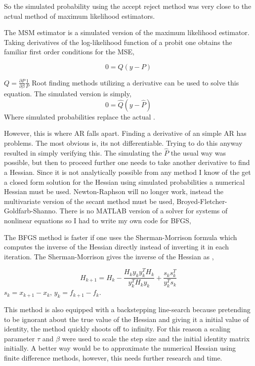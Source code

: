 \documentclass[]{article}
\begin{document}
 So the simulated probability using the accept reject method was very close to the actual method of maximum likelihood estimators. 
 
 The MSM estimator is a simulated version of the maximum likelihood estimator. Taking derivatives of the log-likelihood function of a probit one obtains the familiar first order conditions for the MSE, 
 
 \[ 0 = Q(y - P) \]
 
 $ Q = \frac{\partial P}{\partial\beta} \frac{1}{P} $ Root finding methods utilizing a derivative can be used to solve this equation. The simulated version is simply, 
 \[ 0 = \hat{Q}(y - \hat{P}) \]
 Where simulated probabilities replace the actual \cite{sternSimulation}. 
 
 However, this is where AR falls apart. Finding a derivative of an simple AR has problems. The most obvious is, its not differentiable. Trying to do this anyway resulted in simply verifying this. The simulating the $ \hat{P} $ the usual way was possible, but then to proceed further one needs to take another derivative to find a Hessian. Since it is not analytically possible from any method I know of the get a closed form solution for the Hessian using simulated probabilities a numerical Hessian must be used. Newton-Raphson will no longer work, instead the multivariate version of the secant method must be used, Broyed-Fletcher-Goldfarb-Shanno. There is no MATLAB version of a solver for systems of nonlinear equations so I had to write my own code for BFGS, 
 
 
 
 The BFGS method is faster if one uses the Sherman-Morrison formula which computes the inverse of the Hessian directly instead of inverting it in each iteration. The Sherman-Morrison gives the inverse of the Hessian as ,
 
 \[ H_{k+1} = H_k - \frac{H_ky_ky_k^{T}H_k}{y_k^{T}H_k y_k} + \frac{s_ks_k^{T}}{y_k^{T}s_k  }\]
 $ s_k = x_{k+1} - x_{k} $, $ y_k = f_{k+1} - f_k $. 
 
 This method is also equipped with a backstepping line-search because pretending to be ignorant about the true value of the Hessian and giving it a initial value of identity, the method quickly shoots off to infinity. For this reason a scaling parameter $ \tau $ and $ \beta $ were used to scale the step size and the initial identity matrix initially. A better way would be to approximate the numerical Hessian using finite difference methods, however, this needs further research and time. 
 
\end{document}
